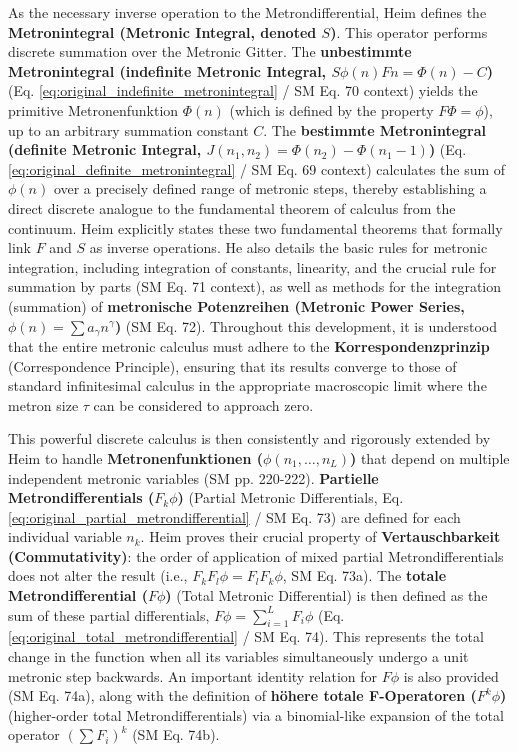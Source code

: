 \documentclass[12pt]{article}
\newcommand{\metron}{\tau}
\newcommand{\metrondifferential}{F} %
\newcommand{\metronintegral}{S} %
\newcommand{\metronenziffer}{n}
\begin{document}
As the necessary inverse operation to the Metrondifferential, Heim defines the \textbf{Metronintegral (Metronic Integral, denoted \( \metronintegral \))}. This operator performs discrete summation over the Metronic Gitter. The \textbf{unbestimmte Metronintegral (indefinite Metronic Integral, \( \metronintegral\phi(\metronenziffer)\metrondifferential\metronenziffer = \Phi(\metronenziffer) - C \))} (Eq. \eqref{eq:original_indefinite_metronintegral} / SM Eq. 70 context) yields the primitive Metronenfunktion \( \Phi(\metronenziffer) \) (which is defined by the property \( \metrondifferential\Phi = \phi \)), up to an arbitrary summation constant \(C\). The \textbf{bestimmte Metronintegral (definite Metronic Integral, \( J(n_1, n_2) = \Phi(n_2) - \Phi(n_1-1) \))} (Eq. \eqref{eq:original_definite_metronintegral} / SM Eq. 69 context) calculates the sum of \( \phi(\metronenziffer) \) over a precisely defined range of metronic steps, thereby establishing a direct discrete analogue to the fundamental theorem of calculus from the continuum. Heim explicitly states these two fundamental theorems that formally link \( \metrondifferential \) and \( \metronintegral \) as inverse operations. He also details the basic rules for metronic integration, including integration of constants, linearity, and the crucial rule for summation by parts (SM Eq. 71 context), as well as methods for the integration (summation) of \textbf{metronische Potenzreihen (Metronic Power Series, \( \phi(\metronenziffer) = \sum a_\gamma \metronenziffer^\gamma \))} (SM Eq. 72). Throughout this development, it is understood that the entire metronic calculus must adhere to the \textbf{Korrespondenzprinzip} (Correspondence Principle), ensuring that its results converge to those of standard infinitesimal calculus in the appropriate macroscopic limit where the metron size \( \metron \) can be considered to approach zero.

This powerful discrete calculus is then consistently and rigorously extended by Heim to handle \textbf{Metronenfunktionen (\( \phi(n_1, \dots, n_L) \))} that depend on multiple independent metronic variables (SM pp. 220-222). \textbf{Partielle Metrondifferentials (\( F_k\phi \))} (Partial Metronic Differentials, Eq. \eqref{eq:original_partial_metrondifferential} / SM Eq. 73) are defined for each individual variable \(n_k\). Heim proves their crucial property of \textbf{Vertauschbarkeit (Commutativity)}: the order of application of mixed partial Metrondifferentials does not alter the result (i.e., \( F_kF_l\phi = F_lF_k\phi \), SM Eq. 73a). The \textbf{totale Metrondifferential (\( F\phi \))} (Total Metronic Differential) is then defined as the sum of these partial differentials, \( F\phi = \sum_{i=1}^L F_i\phi \) (Eq. \eqref{eq:original_total_metrondifferential} / SM Eq. 74). This represents the total change in the function when all its variables simultaneously undergo a unit metronic step backwards. An important identity relation for \( F\phi \) is also provided (SM Eq. 74a), along with the definition of \textbf{höhere totale F-Operatoren (\( F^k\phi \))} (higher-order total Metrondifferentials) via a binomial-like expansion of the total operator \( (\sum F_i)^k \) (SM Eq. 74b).
\end{document}
